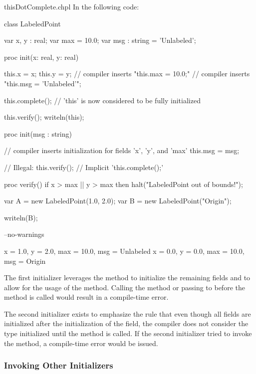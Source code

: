 \begin{chapelexample}{thisDotComplete.chpl}
In the following code:
\begin{chapel}
class LabeledPoint {
  var x, y : real;
  var max = 10.0;
  var msg : string = 'Unlabeled';

  proc init(x: real, y: real) {
    this.x = x;
    this.y = y;
    // compiler inserts "this.max = 10.0;"
    // compiler inserts "this.msg = 'Unlabeled'";

    this.complete(); // 'this' is now considered to be fully initialized

    this.verify();
    writeln(this);
  }

  proc init(msg : string) {
    // compiler inserts initialization for fields 'x', 'y', and 'max'
    this.msg = msg;

    // Illegal: this.verify();
    // Implicit 'this.complete();'
  }

  proc verify() {
    if x > max || y > max then
      halt("LabeledPoint out of bounds!");
  }
}

var A = new LabeledPoint(1.0, 2.0);
var B = new LabeledPoint("Origin");
\end{chapel}
\begin{chapelpost}
writeln(B);
\end{chapelpost}
\begin{chapelcompopts}
--no-warnings
\end{chapelcompopts}
\begin{chapeloutput}
{x = 1.0, y = 2.0, max = 10.0, msg = Unlabeled}
{x = 0.0, y = 0.0, max = 10.0, msg = Origin}
\end{chapeloutput}

The first initializer leverages the  method to initialize the
remaining fields and to allow for the usage of the  method.
Calling the  method or passing  to 
before the  method is called would result in a compile-time
error.

The second initializer exists to emphasize the rule that even though all
fields are initialized after the initialization of the  field, the
compiler does not consider the type initialized until the 
method is called. If the second initializer tried to invoke the 
method, a compile-time error would be issued.
\end{chapelexample}

\subsubsection{Invoking Other Initializers}
\label{Invoking_Other_Initializers}

